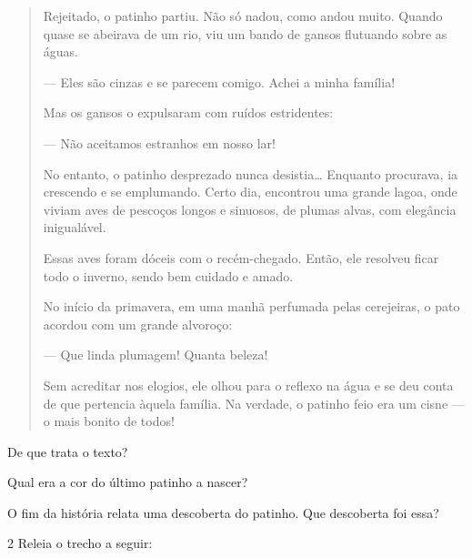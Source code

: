 \begin{escolha}
\begin{escolha}
\begin{quote}
Rejeitado, o patinho partiu. Não só nadou, como andou muito. Quando
quase se abeirava de um rio, viu um bando de gansos flutuando sobre as
águas.

--- Eles são cinzas e se parecem comigo. Achei a minha família!

Mas os gansos o expulsaram com ruídos estridentes:

--- Não aceitamos estranhos em nosso lar!

No entanto, o patinho desprezado nunca desistia\ldots{} Enquanto procurava,
ia crescendo e se emplumando. Certo dia, encontrou uma grande lagoa,
onde viviam aves de pescoços longos e sinuosos, de plumas alvas, com
elegância inigualável.

Essas aves foram dóceis com o recém-chegado. Então, ele resolveu ficar
todo o inverno, sendo bem cuidado e amado.

No início da primavera, em uma manhã perfumada pelas cerejeiras, o pato
acordou com um grande alvoroço:

--- Que linda plumagem! Quanta beleza!

Sem acreditar nos elogios, ele olhou para o reflexo na água e se deu
conta de que pertencia àquela família. Na verdade, o patinho feio era um
cisne --- o mais bonito de todos!

\end{quote}

\begin{escolha}
\item De que trata o texto?


\item Qual era a cor do último patinho a nascer?


\item O fim da história relata uma descoberta do patinho. Que descoberta
foi essa?

\end{escolha}

\num{2} Releia o trecho a seguir:


\end{escolha}
\end{escolha}
